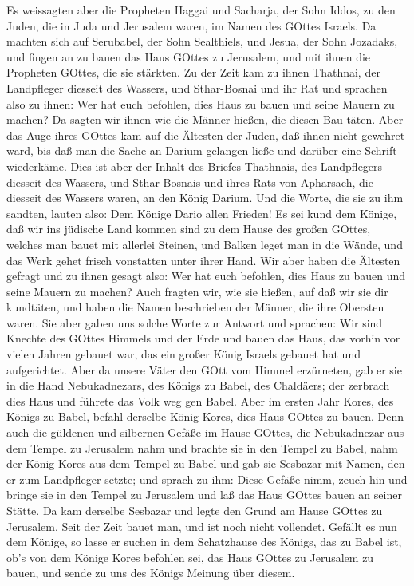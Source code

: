  Es weissagten aber die Propheten Haggai und Sacharja, der
Sohn Iddos, zu den Juden, die in Juda und Jerusalem waren, im Namen des
GOttes Israels.  Da machten sich auf Serubabel, der Sohn
Sealthiels, und Jesua, der Sohn Jozadaks, und fingen an zu bauen das
Haus GOttes zu Jerusalem, und mit ihnen die Propheten GOttes, die sie
stärkten.  Zu der Zeit kam zu ihnen Thathnai, der
Landpfleger diesseit des Wassers, und Sthar-Bosnai und ihr Rat und
sprachen also zu ihnen: Wer hat euch befohlen, dies Haus zu bauen und
seine Mauern zu machen?  Da sagten wir ihnen wie die Männer
hießen, die diesen Bau täten.  Aber das Auge ihres GOttes
kam auf die Ältesten der Juden, daß ihnen nicht gewehret ward, bis daß
man die Sache an Darium gelangen ließe und darüber eine Schrift
wiederkäme.  Dies ist aber der Inhalt des Briefes Thathnais,
des Landpflegers diesseit des Wassers, und Sthar-Bosnais und ihres Rats
von Apharsach, die diesseit des Wassers waren, an den König Darium.
 Und die Worte, die sie zu ihm sandten, lauten also: Dem
Könige Dario allen Frieden!  Es sei kund dem Könige, daß wir
ins jüdische Land kommen sind zu dem Hause des großen GOttes, welches
man bauet mit allerlei Steinen, und Balken leget man in die Wände, und
das Werk gehet frisch vonstatten unter ihrer Hand.  Wir aber
haben die Ältesten gefragt und zu ihnen gesagt also: Wer hat euch
befohlen, dies Haus zu bauen und seine Mauern zu machen? 
Auch fragten wir, wie sie hießen, auf daß wir sie dir kundtäten, und
haben die Namen beschrieben der Männer, die ihre Obersten waren.
 Sie aber gaben uns solche Worte zur Antwort und sprachen:
Wir sind Knechte des GOttes Himmels und der Erde und bauen das Haus, das
vorhin vor vielen Jahren gebauet war, das ein großer König Israels
gebauet hat und aufgerichtet.  Aber da unsere Väter den
GOtt vom Himmel erzürneten, gab er sie in die Hand Nebukadnezars, des
Königs zu Babel, des Chaldäers; der zerbrach dies Haus und führete das
Volk weg gen Babel.  Aber im ersten Jahr Kores, des Königs
zu Babel, befahl derselbe König Kores, dies Haus GOttes zu bauen.
 Denn auch die güldenen und silbernen Gefäße im Hause
GOttes, die Nebukadnezar aus dem Tempel zu Jerusalem nahm und brachte
sie in den Tempel zu Babel, nahm der König Kores aus dem Tempel zu Babel
und gab sie Sesbazar mit Namen, den er zum Landpfleger setzte;
 und sprach zu ihm: Diese Gefäße nimm, zeuch hin und bringe
sie in den Tempel zu Jerusalem und laß das Haus GOttes bauen an seiner
Stätte.  Da kam derselbe Sesbazar und legte den Grund am
Hause GOttes zu Jerusalem. Seit der Zeit bauet man, und ist noch nicht
vollendet.  Gefällt es nun dem Könige, so lasse er suchen
in dem Schatzhause des Königs, das zu Babel ist, ob's von dem Könige
Kores befohlen sei, das Haus GOttes zu Jerusalem zu bauen, und sende zu
uns des Königs Meinung über diesem.

